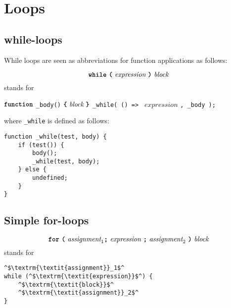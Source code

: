 \section*{Loops}

\subsection*{while-loops}

While loops are seen as abbreviations for function applications as follows:

\[
\textbf{\texttt{while}}\ \textbf{\texttt{(}}\  \textit{expression} \ \textbf{\texttt{)}} \
\textit{block}
\]
stands for

\begin{center}
  \begin{minipage}{90mm}
$\textbf{\texttt{function}}$ \lstinline{_body()} $\textbf{\texttt{\{}}\  \textit{block} \ \textbf{\texttt{\}}}$\newline
\lstinline{_while( () => } $\textit{expression}$ \lstinline{, _body );}
  \end{minipage}
\end{center}

where \lstinline{_while} is defined as follows:

\begin{lstlisting}
function _while(test, body) {
    if (test()) {
        body(); 
        _while(test, body); 
    } else { 
        undefined; 
    }
}
\end{lstlisting}

\subsection*{Simple for-loops}

\[\textbf{\texttt{for}}\ \textbf{\texttt{(}} \ 
                                          \textit{assignment}_1 \textbf{\texttt{;}} 
\ \textit{expression} \ \textbf{\texttt{;}} \ \textit{assignment}_2 \ \textbf{\texttt{)}} \ 
                                            \textit{block}
\]
stands for
\begin{center}
  \begin{minipage}{90mm}
\begin{lstlisting}
^$\textrm{\textit{assignment}}_1$^  
while (^$\textrm{\textit{expression}}$^) {
    ^$\textrm{\textit{block}}$^
    ^$\textrm{\textit{assignment}}_2$^
}
\end{lstlisting}
  \end{minipage}
\end{center}

